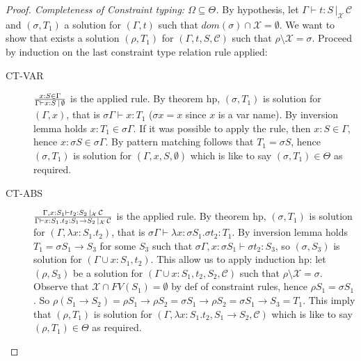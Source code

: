 \documentclass[8pt]{beamer}
\begin{document}
\begin{frame}
    \footnotesize
    \begin{proof}[Proof. Completeness of Constraint typing: 
        $\Omega \subseteq \Theta$]
        By hypothesis, let $\Gamma \vdash t : S \, |_{\mathcal{X}} \,
        \mathcal{C}$  and 
        $(\sigma, T_1)$ a solution for $(\Gamma, t)$ such that 
        $dom(\sigma)\cap\mathcal{X} = \emptyset$. We want to show
        that exists a solution $(\rho, T_1)$ for $(\Gamma, t, S,
        \mathcal{C})$ such that $\rho\setminus\mathcal{X}=\sigma$.
        Proceed by induction on the last constraint type relation rule 
        applied:
        \begin{description}
            \item[CT-VAR] ${{x:S\in\Gamma}\over{\Gamma \vdash x:S
                \,|\,\emptyset}}$ is the applied
                rule. By theorem hp, $(\sigma, T_1)$ is solution for
                $(\Gamma, x)$, that is $\sigma
                \Gamma \vdash x : T_1$ ($\sigma x = x$ since $x$ is a
                var name). By inversion lemma
                holds $x:T_1 \in \sigma\Gamma$. If it was possible to
                apply the rule, then $x:S\in\Gamma$, hence $x:\sigma
                S\in \sigma \Gamma$. By
                pattern matching follows that $T_1 = \sigma S$, hence
                $(\sigma, T_1)$ is solution for
                $(\Gamma,x,S,\emptyset)$ which is like to say
                $(\sigma, T_1)\in\Theta$ as required. 
            \item[CT-ABS] ${{\Gamma, x:S_1\vdash t_2: S_2 
                \,|_{\mathcal{X}}\,\mathcal{C}}\over{
                \Gamma \vdash x:S_1.t_2:S_1 
                \rightarrow S_2 \,|_{\mathcal{X}}\,
                \mathcal{C}}}$ is the applied 
                rule. By theorem hp, $(\sigma, T_1)$ is solution for
                $(\Gamma, \lambda x:S_1.t_2)$, that is $\sigma \Gamma
                \vdash \lambda x:\sigma S_1.\sigma t_2 : T_1$. By
                inversion lemma holds $T_1 = \sigma S_1\rightarrow
                S_3$ for some $S_3$ such that $\sigma \Gamma, x:\sigma
                S_1\vdash \sigma t_2 : S_3$, so $(\sigma, S_3)$ is
                solution for $(\Gamma \cup x:S_1, t_2)$. This allow us
                to apply induction hp: let $(\rho, S_3)$ be a solution
                for $(\Gamma \cup x:S_1, t_2, S_2, \mathcal{C})$ such
                that $\rho \setminus \mathcal{X} = \sigma$. Observe
                that $\mathcal{X}\cap FV(S_1)=\emptyset$ by def of
                constraint rules, hence $\rho
                S_1 = \sigma S_1$. So $\rho (S_1 \rightarrow S_2) =
                \rho S_1 \rightarrow \rho S_2 = \sigma S_1 \rightarrow
                \rho S_2 = \sigma S_1 \rightarrow S_3 = T_1$. This
                imply that $(\rho, T_1)$ is solution for $(\Gamma,
                \lambda x:S_1.t_2, S_1\rightarrow S_2,
                \mathcal{C})$ which is like to say
                $(\rho, T_1)\in\Theta$ as required.
        \end{description}
    \end{proof}
    \normalsize
\end{frame}
\end{document}
